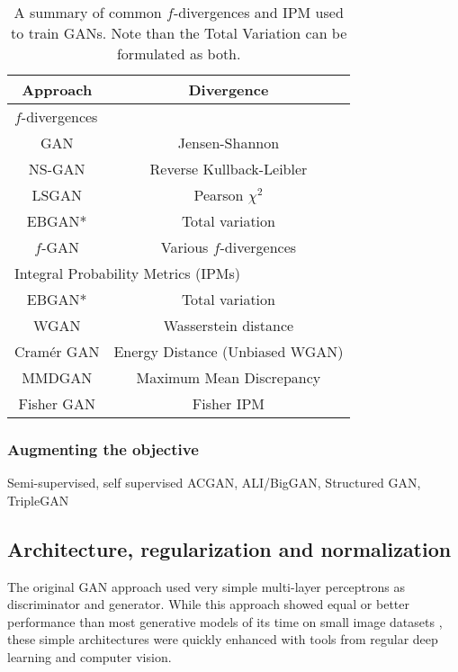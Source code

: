 \begin{table}
	\centering
	\begin{tabular}{|c c|}
		\hline
		Approach & Divergence \\
		\hline 
		\multicolumn{2}{|l|}{$f$-divergences} \\
		\hline
		GAN \citep{Goodfellow2014}& Jensen-Shannon \\
		NS-GAN \citep{Goodfellow2014} & Reverse Kullback-Leibler \\
		LSGAN \citep{Mao2017}& Pearson $\chi^2$ \\
		EBGAN* \citep{Zhao2017} & Total variation \\
		$f$-GAN \citep{Nowozin2016} & Various $f$-divergences\\
		\hline 
		\multicolumn{2}{|l|}{Integral Probability Metrics (\ac{IPM}s)}\\
		\hline
		EBGAN* \citep{Zhao2017} & Total variation \\
		WGAN \citep{Arjovsky2017}& Wasserstein distance \\
		Cramér GAN \citep{Bellemare2017}& Energy Distance (Unbiased WGAN) \\
		MMDGAN \citep{Li2017a}& Maximum Mean Discrepancy \\				
		Fisher GAN\citep{Mroueh2017}& Fisher IPM \\
		\hline
	\end{tabular}
	\label{table:divergences}
	\caption{A summary of common $f$-divergences and \ac{IPM} used to train GANs. Note than the Total Variation can be formulated as both.}
\end{table}


\subsubsection{Augmenting the objective}


Semi-supervised, self supervised
ACGAN, ALI/BigGAN, Structured GAN, TripleGAN


\subsection{Architecture, regularization and normalization}

The original GAN approach \citep{Goodfellow2014} used very simple multi-layer perceptrons as discriminator and generator. While this approach showed equal or better performance than most generative models of its time \citep{Kingma2014b,Bengio2014} on small image datasets \citep{LeCun1998a, Krizhevsky2009}, these simple architectures were quickly enhanced with tools from regular deep learning and computer vision.

